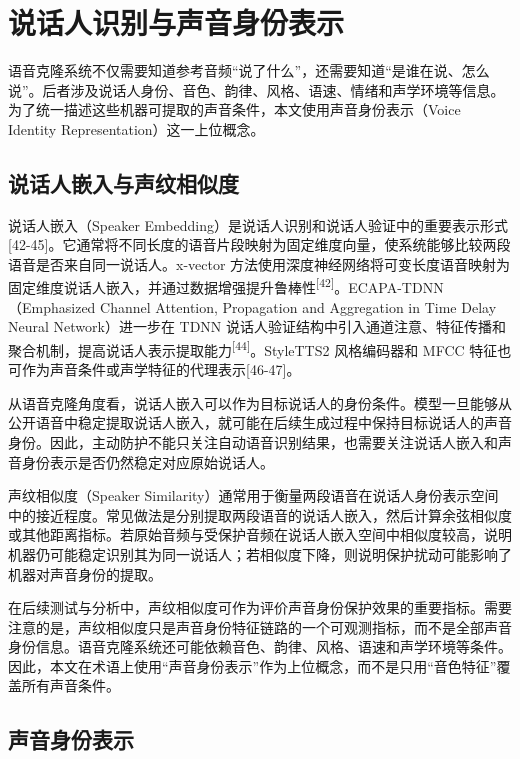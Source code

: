 \section{说话人识别与声音身份表示}\label{ux8bf4ux8bddux4ebaux8bc6ux522bux4e0eux58f0ux97f3ux8eabux4efdux8868ux793a}

语音克隆系统不仅需要知道参考音频``说了什么''，还需要知道``是谁在说、怎么说''。后者涉及说话人身份、音色、韵律、风格、语速、情绪和声学环境等信息。为了统一描述这些机器可提取的声音条件，本文使用声音身份表示（Voice
Identity Representation）这一上位概念。

\subsection{说话人嵌入与声纹相似度}\label{ux8bf4ux8bddux4ebaux5d4cux5165ux4e0eux58f0ux7eb9ux76f8ux4f3cux5ea6}

说话人嵌入（Speaker
Embedding）是说话人识别和说话人验证中的重要表示形式{[}42-45{]}。它通常将不同长度的语音片段映射为固定维度向量，使系统能够比较两段语音是否来自同一说话人。x-vector
方法使用深度神经网络将可变长度语音映射为固定维度说话人嵌入，并通过数据增强提升鲁棒性\textsuperscript{{[}42{]}}。ECAPA-TDNN（Emphasized
Channel Attention, Propagation and Aggregation in Time Delay Neural
Network）进一步在 TDNN
说话人验证结构中引入通道注意、特征传播和聚合机制，提高说话人表示提取能力\textsuperscript{{[}44{]}}。StyleTTS2
风格编码器和 MFCC 特征也可作为声音条件或声学特征的代理表示{[}46-47{]}。

从语音克隆角度看，说话人嵌入可以作为目标说话人的身份条件。模型一旦能够从公开语音中稳定提取说话人嵌入，就可能在后续生成过程中保持目标说话人的声音身份。因此，主动防护不能只关注自动语音识别结果，也需要关注说话人嵌入和声音身份表示是否仍然稳定对应原始说话人。

声纹相似度（Speaker
Similarity）通常用于衡量两段语音在说话人身份表示空间中的接近程度。常见做法是分别提取两段语音的说话人嵌入，然后计算余弦相似度或其他距离指标。若原始音频与受保护音频在说话人嵌入空间中相似度较高，说明机器仍可能稳定识别其为同一说话人；若相似度下降，则说明保护扰动可能影响了机器对声音身份的提取。

在后续测试与分析中，声纹相似度可作为评价声音身份保护效果的重要指标。需要注意的是，声纹相似度只是声音身份特征链路的一个可观测指标，而不是全部声音身份信息。语音克隆系统还可能依赖音色、韵律、风格、语速和声学环境等条件。因此，本文在术语上使用``声音身份表示''作为上位概念，而不是只用``音色特征''覆盖所有声音条件。

\subsection{声音身份表示}\label{ux58f0ux97f3ux8eabux4efdux8868ux793a}

